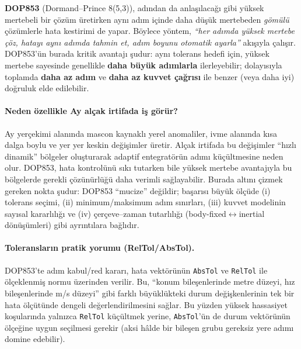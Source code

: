 \textbf{DOP853} (Dormand--Prince 8(5,3)), adından da anlaşılacağı gibi yüksek mertebeli bir çözüm üretirken
aynı adım içinde daha düşük mertebeden \emph{gömülü} çözümlerle hata kestirimi de yapar. Böylece yöntem,
\emph{“her adımda yüksek mertebe çöz, hatayı aynı adımda tahmin et, adım boyunu otomatik ayarla”} akışıyla çalışır.
DOP853'ün burada kritik avantajı şudur: aynı tolerans hedefi için, yüksek mertebe sayesinde genellikle
\textbf{daha büyük adımlarla} ilerleyebilir; dolayısıyla toplamda \textbf{daha az adım} ve \textbf{daha az kuvvet çağrısı}
ile benzer (veya daha iyi) doğruluk elde edilebilir.

\paragraph{Neden özellikle Ay alçak irtifada iş görür?}
Ay yerçekimi alanında mascon kaynaklı yerel anomaliler, ivme alanında kısa dalga boylu ve yer yer keskin değişimler üretir.
Alçak irtifada bu değişimler “hızlı dinamik” bölgeler oluşturarak adaptif entegratörün adımı küçültmesine neden olur.
DOP853, hata kontrolünü sıkı tutarken bile yüksek mertebe avantajıyla bu bölgelerde gerekli çözünürlüğü daha verimli sağlayabilir.
Burada altını çizmek gereken nokta şudur: DOP853 “mucize” değildir; başarısı büyük ölçüde
(i) tolerans seçimi, (ii) minimum/maksimum adım sınırları, (iii) kuvvet modelinin sayısal kararlılığı ve
(iv) çerçeve--zaman tutarlılığı (body-fixed$\leftrightarrow$inertial dönüşümleri) gibi ayrıntılara bağlıdır.

\paragraph{Toleransların pratik yorumu (RelTol/AbsTol).}
DOP853'te adım kabul/red kararı, hata vektörünün \texttt{AbsTol} ve \texttt{RelTol} ile ölçeklenmiş normu üzerinden verilir.
Bu, “konum bileşenlerinde metre düzeyi, hız bileşenlerinde m/s düzeyi” gibi farklı büyüklükteki durum değişkenlerinin
tek bir hata ölçütünde dengeli değerlendirilmesini sağlar. Bu yüzden yüksek hassasiyet koşularında yalnızca
\texttt{RelTol} küçültmek yerine, \texttt{AbsTol}'ün de durum vektörünün ölçeğine uygun seçilmesi gerekir
(aksi hâlde bir bileşen grubu gereksiz yere adımı domine edebilir).


